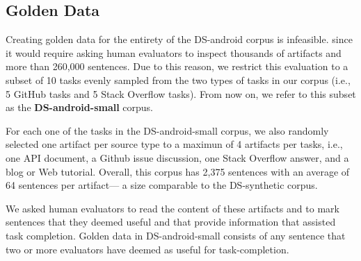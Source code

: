 







\subsection{Golden Data}


Creating golden data for the entirety of the \acs{DS-android} corpus is infeasible.
since it would require asking human evaluators to inspect thousands of artifacts and more than 260,000 sentences.
Due to this reason, we restrict this evaluation to a subset of 10 tasks evenly sampled from the two types of tasks in our corpus (i.e., 5 GitHub tasks and 5 Stack Overflow tasks). 
From now on, we refer to this subset as the \textbf{\acs{DS-android-small}} corpus.


For each one of the tasks in the \acs{DS-android-small} corpus, we also randomly selected 
one artifact per source type to a maximun of 4 artifacts per tasks, i.e., one API document, a Github issue discussion, one Stack Overflow answer, and a blog or Web tutorial.
Overall, this corpus has 2,375 sentences with an average of 64 sentences per artifact---
a size comparable to the \acs{DS-synthetic} corpus.


We asked human evaluators to read the content of these artifacts and 
to mark sentences that they deemed useful and that provide information that assisted task completion.
Golden data in \acs{DS-android-small} consists of any sentence that two or more evaluators have deemed as useful for task-completion.



